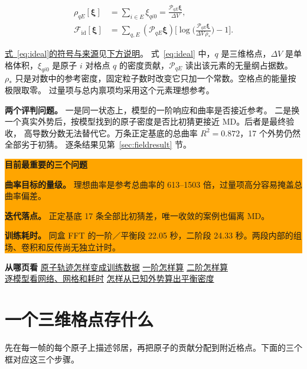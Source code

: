 \documentclass[UTF8,fontset=fandol,11pt]{ctexart}
\newcommand{\xiF}{\bm\xi}
\newcommand{\Id}{\mathcal F_{\mathrm{id}}}
\newcommand{\fref}[2]{\par{\footnotesize \hyperref[#1]{式~\ref{#1}的符号与来源}见\hyperref[#2]{下方说明}。}}
\newcommand{\defat}[1]{\phantomsection\label{#1}}
\begin{document}
\begin{equation}
\begin{aligned}
\rho_{qE}[\xiF]&=\sum_{i\in E}\xi_{qi0}
=\frac{\mathcal P_{qE}\xiF}{\Delta V},\\
\Id[\xiF]&=\sum_{q,E}(\mathcal P_{qE}\xiF)
\biggl[\log\!\biggl(\frac{\mathcal P_{qE}\xiF}{\Delta V\,\rho_*}\biggr)-1\biggr].
\end{aligned}
\label{eq:ideal}
\end{equation}
\fref{eq:ideal}{def:ideal}
\defat{def:ideal}
式~\ref{eq:ideal} 中，$q$ 是三维格点，$\Delta V$ 是单格体积，$\xi_{qi0}$ 是原子 $i$ 对格点 $q$ 的密度贡献，$\mathcal P_{qE}$ 读出该元素的无量纲占据数。
$\rho_*$ 只是对数中的参考密度，固定粒子数时改变它只加一个常数。空格点的能量按极限取零。
过量项与总内禀项均采用这个元素理想参考。

\textbf{两个评判问题。} 一是同一状态上，模型的一阶响应和曲率是否接近参考。
二是换一个真实外势后，按模型找到的原子密度是否比初猜更接近 MD。后者是最终验收，
高导数分数无法替代它。万条正定基底的总曲率 \(R^2=0.872\)，17 个外势仍然全部劣于初猜。
逐条结果见第~\ref{sec:fieldresult} 节。

\medskip
\noindent\colorbox{orange}{\parbox{\dimexpr\linewidth-2\fboxsep\relax}{\small
\textbf{\color{warm}目前最重要的三个问题}\par
\textbf{曲率目标的量级。} 理想曲率是参考总曲率的 613–1503 倍，过量项高分容易掩盖总曲率偏差。\par
\textbf{迭代落点。} 正定基底 17 条全部比初猜差，唯一收敛的案例也偏离 MD。\par
\textbf{训练耗时。} 同盒 FFT 的一阶／平衡段 22.05 秒，二阶段 24.33 秒。两段内部的组场、卷积和反传尚无独立计时。}}

\medskip
\textbf{从哪页看}\quad
\hyperref[sec:preprocess]{原子轨迹怎样变成训练数据}\quad
\hyperref[sec:first]{一阶怎样算}\quad
\hyperref[sec:second]{二阶怎样算}\\
\hspace*{5em}\hyperref[sec:exfft]{逐模型看网络、网格和耗时}\quad
\hyperref[sec:iterate]{怎样从已知外势算出平衡密度}

\clearpage
\section{一个三维格点存什么}\label{sec:grid}

先在每一帧的每个原子上描述邻居，再把原子的贡献分配到附近格点。下面的三个框对应这三个步骤。
\end{document}
